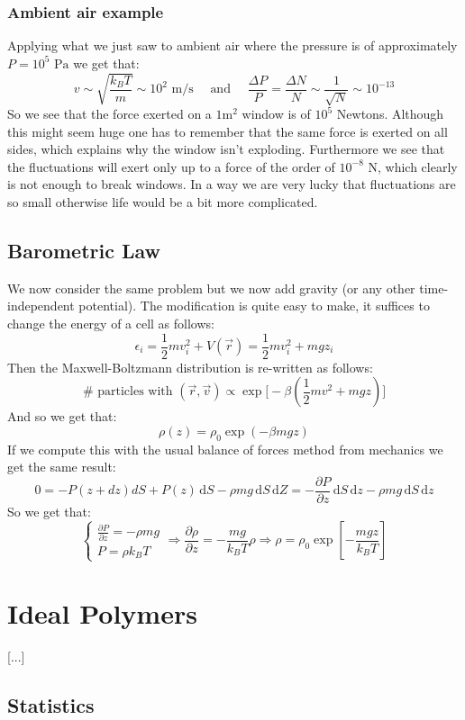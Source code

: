 \documentclass[10pt,a4paper]{book}
\begin{document}
\subsubsection{Ambient air example}
Applying what we just saw to ambient air where the pressure is of approximately $P = 10^5 \text{ Pa}$ we get that:
\[
v \sim \sqrt{\frac{k_B T}{m}} \sim 10^2 \text{ m}/\text{s} \quad \text{ and } \quad \frac{\Delta P}{P} = \frac{\Delta N}{N} \sim \frac{1}{\sqrt{N}} \sim 10^{-13}
\]
So we see that the force exerted on a $1\text{m}^2$ window is of $10^5$ Newtons. Although this might seem huge one has to remember that the same force is exerted on all sides, which explains why the window isn't exploding. Furthermore we see that the fluctuations will exert only up to a force of the order of $10^{-8}$ N, which clearly is not enough to break windows. In a way we are very lucky that fluctuations are so small otherwise life would be a bit more complicated.

\subsection{Barometric Law}
We now consider the same problem but we now add gravity (or any other time-independent potential). The modification is quite easy to make, it suffices to change the energy of a cell as follows:
\[
\epsilon_i = \frac{1}{2}mv_i^2 + V(\vec{r}) = \frac{1}{2}mv_i^2 + mgz_i
\]
Then the Maxwell-Boltzmann distribution is re-written as follows:
\[
\# \text{ particles with } (\vec{r}, \vec{v}) \propto \exp\Big[ -\beta\left( \frac{1}{2}mv^2 + mgz \right) \Big]
\]
And so we get that:
\[
\rho(z) = \rho_0 \exp(-\beta m g z)
\]
If we compute this with the usual balance of forces method from mechanics we get the same result:
\[
0 = -P(z+dz)dS + P(z)\,\text{d}S - \rho m g \, \text{d}S\, \text{d}Z = -\frac{\partial P}{\partial z} \,\text{d}S\, \text{d}z - \rho mg\, \text{d}S \, \text{d}z
\]
So we get that:
\[
\begin{cases}
\frac{\partial P}{\partial z} = - \rho m g\\
P = \rho k_B T
\end{cases}
\Rightarrow \frac{\partial \rho}{\partial z} = - \frac{mg}{k_B T}\rho \Rightarrow \rho = \rho_0 \exp\left[-\frac{mgz}{k_B T}\right]
\]


\section{Ideal Polymers}
[...]
\subsection{Statistics}
\end{document}
